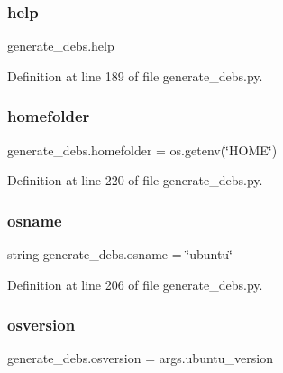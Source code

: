 \subsubsection{\texorpdfstring{help}{help}}
{\footnotesize\ttfamily generate\+\_\+debs.\+help}



Definition at line 189 of file generate\+\_\+debs.\+py.

\mbox{\label{namespacegenerate__debs_aeb83979be2939a8059435a906a91f682}} 
\subsubsection{\texorpdfstring{homefolder}{homefolder}}
{\footnotesize\ttfamily generate\+\_\+debs.\+homefolder = os.\+getenv(\char`\"{}H\+O\+ME\char`\"{})}



Definition at line 220 of file generate\+\_\+debs.\+py.

\mbox{\label{namespacegenerate__debs_ad06322332de29cb27a40152d0cccc2ca}} 
\subsubsection{\texorpdfstring{osname}{osname}}
{\footnotesize\ttfamily string generate\+\_\+debs.\+osname = \char`\"{}ubuntu\char`\"{}}



Definition at line 206 of file generate\+\_\+debs.\+py.

\mbox{\label{namespacegenerate__debs_afd02fe6ead63bc5db5d3c3b9eb973b62}} 
\subsubsection{\texorpdfstring{osversion}{osversion}}
{\footnotesize\ttfamily generate\+\_\+debs.\+osversion = args.\+ubuntu\+\_\+version}



